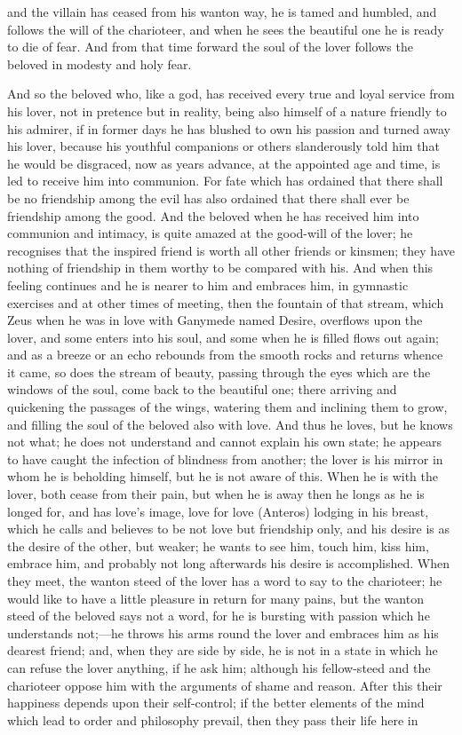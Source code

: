 \documentclass[11pt,letter]{article}
\begin{document}
and the villain has ceased from his wanton way, he is tamed and humbled, and follows the will of the charioteer, and when he sees the beautiful one he is ready to die of fear. And from that time forward the soul of the lover follows the beloved in modesty and holy fear.

\par  And so the beloved who, like a god, has received every true and loyal service from his lover, not in pretence but in reality, being also himself of a nature friendly to his admirer, if in former days he has blushed to own his passion and turned away his lover, because his youthful companions or others slanderously told him that he would be disgraced, now as years advance, at the appointed age and time, is led to receive him into communion. For fate which has ordained that there shall be no friendship among the evil has also ordained that there shall ever be friendship among the good. And the beloved when he has received him into communion and intimacy, is quite amazed at the good-will of the lover; he recognises that the inspired friend is worth all other friends or kinsmen; they have nothing of friendship in them worthy to be compared with his. And when this feeling continues and he is nearer to him and embraces him, in gymnastic exercises and at other times of meeting, then the fountain of that stream, which Zeus when he was in love with Ganymede named Desire, overflows upon the lover, and some enters into his soul, and some when he is filled flows out again; and as a breeze or an echo rebounds from the smooth rocks and returns whence it came, so does the stream of beauty, passing through the eyes which are the windows of the soul, come back to the beautiful one; there arriving and quickening the passages of the wings, watering them and inclining them to grow, and filling the soul of the beloved also with love. And thus he loves, but he knows not what; he does not understand and cannot explain his own state; he appears to have caught the infection of blindness from another; the lover is his mirror in whom he is beholding himself, but he is not aware of this. When he is with the lover, both cease from their pain, but when he is away then he longs as he is longed for, and has love's image, love for love (Anteros) lodging in his breast, which he calls and believes to be not love but friendship only, and his desire is as the desire of the other, but weaker; he wants to see him, touch him, kiss him, embrace him, and probably not long afterwards his desire is accomplished. When they meet, the wanton steed of the lover has a word to say to the charioteer; he would like to have a little pleasure in return for many pains, but the wanton steed of the beloved says not a word, for he is bursting with passion which he understands not;—he throws his arms round the lover and embraces him as his dearest friend; and, when they are side by side, he is not in a state in which he can refuse the lover anything, if he ask him; although his fellow-steed and the charioteer oppose him with the arguments of shame and reason. After this their happiness depends upon their self-control; if the better elements of the mind which lead to order and philosophy prevail, then they pass their life here in 
\end{document}
